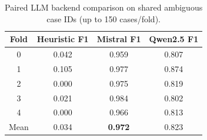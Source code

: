 \begin{table}[!t]
\centering
\caption{Paired LLM backend comparison on shared ambiguous case IDs (up to 150 cases/fold).}
\label{tab:llm}
\begin{tabular}{cccc}
\toprule
Fold & Heuristic F1 & Mistral F1 & Qwen2.5 F1 \\
\midrule
0 & 0.042 & 0.959 & 0.807 \\
1 & 0.105 & 0.977 & 0.874 \\
2 & 0.000 & 0.975 & 0.819 \\
3 & 0.021 & 0.984 & 0.802 \\
4 & 0.000 & 0.966 & 0.813 \\
\midrule
Mean & 0.034 & \textbf{0.972} & 0.823 \\
\bottomrule
\end{tabular}
\end{table}
